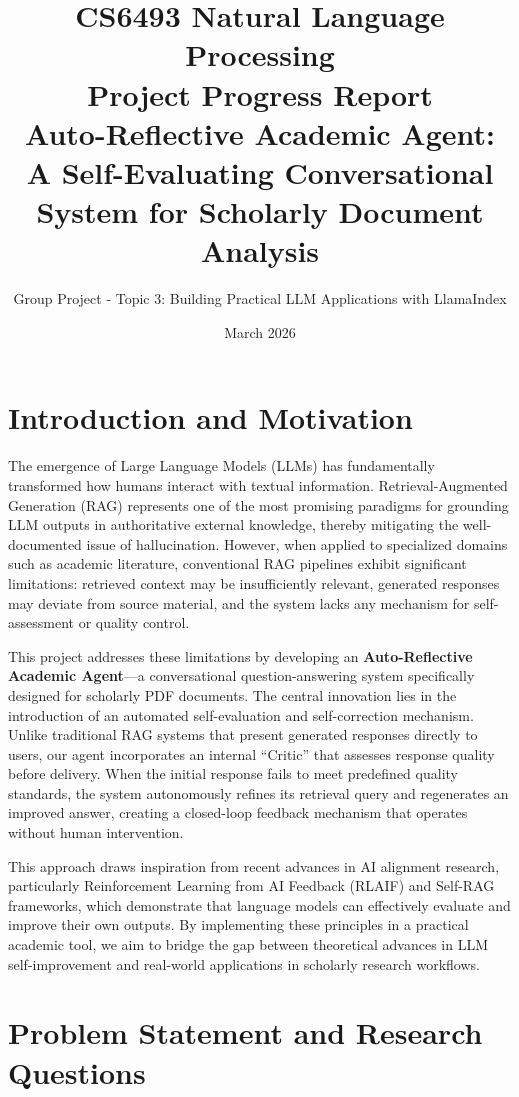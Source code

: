 \documentclass[11pt,a4paper]{article}
\title{CS6493 Natural Language Processing \\ Project Progress Report \\ \vspace{0.5em} \large Auto-Reflective Academic Agent: A Self-Evaluating Conversational System for Scholarly Document Analysis}
\author{Group Project - Topic 3: Building Practical LLM Applications with LlamaIndex}
\date{March 2026}
\begin{document}
\maketitle

\section{Introduction and Motivation}

The emergence of Large Language Models (LLMs) has fundamentally transformed how humans interact with textual information. Retrieval-Augmented Generation (RAG) represents one of the most promising paradigms for grounding LLM outputs in authoritative external knowledge, thereby mitigating the well-documented issue of hallucination. However, when applied to specialized domains such as academic literature, conventional RAG pipelines exhibit significant limitations: retrieved context may be insufficiently relevant, generated responses may deviate from source material, and the system lacks any mechanism for self-assessment or quality control.

This project addresses these limitations by developing an \textbf{Auto-Reflective Academic Agent}—a conversational question-answering system specifically designed for scholarly PDF documents. The central innovation lies in the introduction of an automated self-evaluation and self-correction mechanism. Unlike traditional RAG systems that present generated responses directly to users, our agent incorporates an internal ``Critic'' that assesses response quality before delivery. When the initial response fails to meet predefined quality standards, the system autonomously refines its retrieval query and regenerates an improved answer, creating a closed-loop feedback mechanism that operates without human intervention.

This approach draws inspiration from recent advances in AI alignment research, particularly Reinforcement Learning from AI Feedback (RLAIF) and Self-RAG frameworks, which demonstrate that language models can effectively evaluate and improve their own outputs. By implementing these principles in a practical academic tool, we aim to bridge the gap between theoretical advances in LLM self-improvement and real-world applications in scholarly research workflows.

\section{Problem Statement and Research Questions}
\end{document}
